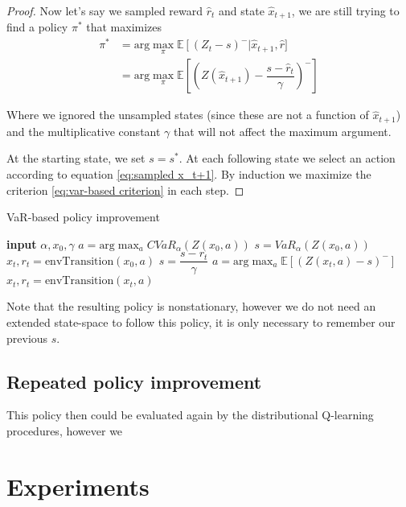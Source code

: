 \begin{proof}
Now let's say we sampled reward $\hat{r}_t$ and state $\hat{x}_{t+1}$, we are still trying to find a policy $\pi^*$ that maximizes 
\begin{equation}\label{eq:sampled x_t+1}
\begin{split}
\pi^* &=\text{arg}\max_\pi \mathbb{E}\left[(Z_t-s)^-\right | \hat{x}_{t+1}, \hat{r}]\\
&= \text{arg}\max_\pi \mathbb{E}\left[\left(Z(\hat{x}_{t+1}) - \dfrac{s - \hat{r}_t}{\gamma}\right)^-\right]
\end{split}
\end{equation}

Where we ignored the unsampled states (since these are not a function of $\hat{x}_{t+1}$) and the multiplicative constant $\gamma$ that will not affect the maximum argument.

At the starting state, we set $s=s^*$. At each following state we select an action according to equation \ref{eq:sampled x_t+1}. By induction we maximize the criterion \ref{eq:var-based criterion} in each step.
\end{proof}

\begin{algorithm}
\caption{VaR-based policy improvement}
\label{alg:var}
\begin{algorithmic}
    \STATE \textbf{input} $\alpha, x_0, \gamma$
    \STATE $a = \text{arg}\max_a CVaR_\alpha(Z(x_0, a))$
    \STATE $s = VaR_\alpha(Z(x_0, a))$
    \STATE $x_t, r_t = \text{envTransition}(x_0, a)$
    	\STATE $s = \dfrac{s-r_t}{\gamma}$
    	\STATE $a = \text{arg}\max_a \mathbb{E}\left[(Z(x_t, a)-s)^- \right]$
    	\STATE $x_t, r_t = \text{envTransition}(x_t, a)$
   	\ENDWHILE
\end{algorithmic}
\end{algorithm}

Note that the resulting policy is nonstationary, however we do not need an extended state-space to follow this policy, it is only necessary to remember our previous $s$.

\subsection{Repeated policy improvement}
This policy then could be evaluated again by the distributional Q-learning procedures, however we 

\section{Experiments}
